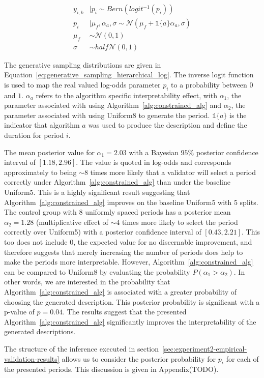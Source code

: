 \begin{equation}\label{eq:generative_sampling_hierarchical_log}
  \begin{split}
    y_{i,k} &\mid p_i \sim Bern(logit^{-1}(p_i)) \\
    p_i &\mid \mu_f,\alpha_a,\sigma \sim \mathcal{N}(\mu_f + \mathbb{1}\{a\} \alpha_a, \sigma ) \\
    \mu_f &\sim \mathcal{N}(0,1) \\
    \sigma &\sim half\mathcal{N}(0,1)
  \end{split}
\end{equation}

The generative sampling distributions are given in Equation~\ref{eq:generative_sampling_hierarchical_log}. The inverse logit function is used to map the real valued log-odds parameter $p_i$ to a probability between $0$ and $1$. $\alpha_a$ refers to the algorithm specific interpretability effect, with $\alpha_1$, the parameter associated with using Algorithm~\ref{alg:constrained_alg} and $\alpha_2$, the parameter associated with using Uniform8 to generate the period. $\mathbb{1}\{a\}$ is the indicator that algorithm $a$ was used to produce the description and define the duration for period $i$.

The mean posterior value for $\alpha_1 = 2.03$ with a Bayesian $95\%$ posterior confidence interval of $[1.18, 2.96]$. The value is quoted in log-odds and corresponds approximately to being $\sim 8$ times more likely that a validator will select a period correctly under Algorithm~\ref{alg:constrained_alg} than under the baseline Uniform5. This is a highly significant result suggesting that Algorithm~\ref{alg:constrained_alg} improves on the baseline Uniform5 with 5 splits. The control group with 8 uniformly spaced periods has a posterior mean $\alpha_2 = 1.28$ (multiplicative effect of $\sim 4$ times more likely to select the period correctly over Uniform5) with a posterior confidence interval of $[0.43, 2.21]$. This too does not include $0$, the expected value for no discernable improvement, and therefore suggests that merely increasing the number of periods does help to make the periods more interpretable. However, Algorithm~\ref{alg:constrained_alg} can be compared to Uniform8 by evaluating the probability $P(\alpha_1 > \alpha_2)$. In other words, we are interested in the probability that Algorithm~\ref{alg:constrained_alg} is associated with a greater probability of choosing the generated description. This posterior probability is significant with a p-value of $p = 0.04$. The results suggest that the presented Algorithm~\ref{alg:constrained_alg} significantly improves the interpretability of the generated descriptions.

The structure of the inference executed in section~\ref{sec:experiment2-empirical-validation-results} allows us to consider the posterior probability for $p_i$ for each of the presented periods. This discussion is given in Appendix(TODO).%
